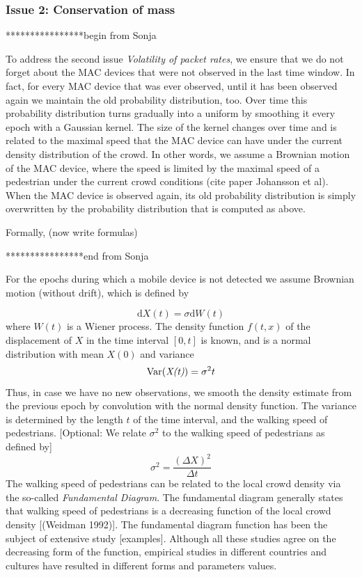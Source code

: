 \documentclass[10pt,a4paper]{article}
\begin{document}
\subsubsection{Issue 2: Conservation of mass }
****************begin from Sonja

To address the second issue {\it Volatility of packet rates}, we ensure that we do not forget about the MAC devices that were not observed in the last time window. In fact, for every MAC device that was ever observed, until it has been observed again we maintain the old probability distribution, too. Over time this probability distribution turns gradually into a uniform by smoothing it every epoch with a Gaussian kernel. The size of the kernel changes over time and is related to the maximal speed that the MAC device can have under the current density distribution of the crowd. In other words, we assume a Brownian motion of the MAC device, where the speed is limited by the maximal speed of a pedestrian under the current crowd conditions (cite paper Johansson et al). When the MAC device is observed again, its old probability distribution is simply overwritten by the probability distribution that is computed as above. 

Formally,  (now write formulas) 

****************end from Sonja\\

For the epochs during which a mobile device is not detected we assume Brownian motion (without drift), which is defined by

\begin{equation}
\text{d}X(t)=\sigma\text{d}W(t)
\end{equation}
where $W(t)$ is a Wiener process. The density function $f(t,x)$ of the displacement of $X$ in the time interval $[0,t]$ is known, and is a normal distribution with mean $X(0)$ and variance
\begin{equation}
\text{Var(\textit{X(t)})}=\sigma^{2}t
\end{equation}
Thus, in case we have no new observations, we smooth the density estimate from the previous epoch by convolution with the normal density function. 
The variance is determined by the length $t$ of the time interval, and the walking speed of pedestrians.
[Optional: We relate $\sigma^2$ to the walking speed of pedestrians as defined by]
\begin{equation}
\sigma^2=\frac{(\Delta X)^2}{\Delta t}
\end{equation}
The walking speed of pedestrians can be related to the local crowd density via the so-called \textit{Fundamental Diagram}. 
The fundamental diagram generally states that walking speed of pedestrians is a decreasing function of the local crowd density [(Weidman 1992)].
The fundamental diagram function has been the subject of extensive study [examples].
Although all these studies agree on the decreasing form of the function, empirical studies in different countries and cultures have resulted in different forms and parameters values.
\end{document}
